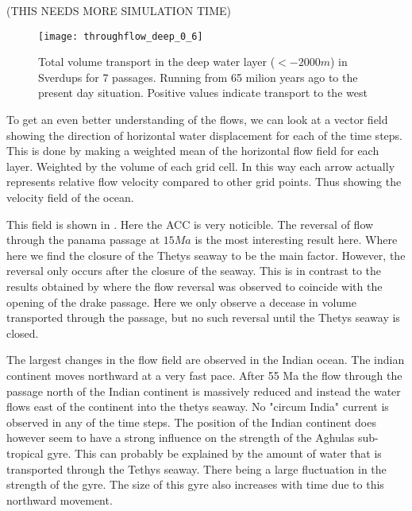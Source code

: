 (THIS NEEDS MORE SIMULATION TIME)
\begin{figure}[H]
	\texttt{[image: throughflow\_deep\_0\_6]}
	\caption{Total volume transport in the deep water layer ($<-2000m$) in Sverdups for 7 passages. Running from 65 milion years ago to the present day situation. Positive values indicate transport to the west}
	\label{fig:throughflow_bottom}
\end{figure}


To get an even better understanding of the flows, we can look at a vector field showing the direction of horizontal water displacement for each of the time steps. This is done by making a weighted mean of the horizontal flow field for each layer. Weighted by the volume of each grid cell. In this way each arrow actually represents relative flow velocity compared to other grid points. Thus showing the velocity field of the ocean. 

This field is shown in . Here the ACC is very noticible. The reversal of flow through the panama passage at $15Ma$ is the most interesting result here.  Where here we find the closure of the Thetys seaway to be the main factor. However, the reversal only occurs after the closure of the seaway. This is in contrast to the results obtained by \cite{omta2003physical} where the flow reversal was observed to coincide with the opening of the drake passage. Here we only observe a decease in volume transported through the passage, but no such reversal until the Thetys seaway is closed.

The largest changes in the flow field are observed in the Indian ocean. The indian continent moves northward at a very fast pace. After 55 Ma the flow through the passage north of the Indian continent is massively reduced and instead the water flows east of the continent into the thetys seaway. No "circum India" current is observed in any of the time steps. The position of the Indian continent does however seem to have a strong influence on the strength of the Aghulas sub-tropical gyre. This can probably be explained by the amount of water that is transported through the Tethys seaway. There being a large fluctuation in the strength of the gyre. The size of this gyre also increases with time due to this northward movement.
